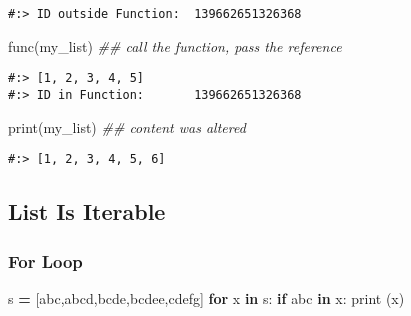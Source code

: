 \documentclass[
]{book}
\newenvironment{Shaded}{\begin{snugshade}}{\end{snugshade}}
\newcommand{\BuiltInTok}[1]{#1}
\newcommand{\CommentTok}[1]{\textcolor[rgb]{0.37,0.37,0.37}{\textit{#1}}}
\newcommand{\ControlFlowTok}[1]{\textcolor[rgb]{0.27,0.27,0.27}{\textbf{#1}}}
\newcommand{\KeywordTok}[1]{\textcolor[rgb]{0.27,0.27,0.27}{\textbf{#1}}}
\newcommand{\NormalTok}[1]{#1}
\newcommand{\OperatorTok}[1]{\textcolor[rgb]{0.43,0.43,0.43}{\textbf{#1}}}
\newcommand{\StringTok}[1]{\textcolor[rgb]{0.5,0.5,0.5}{#1}}
\begin{document}
\begin{verbatim}
#:> ID outside Function:  139662651326368
\end{verbatim}

\begin{Shaded}
\begin{Highlighting}[]
\NormalTok{func(my\_list)  }\CommentTok{\#\# call the function, pass the reference}
\end{Highlighting}
\end{Shaded}

\begin{verbatim}
#:> [1, 2, 3, 4, 5]
#:> ID in Function:       139662651326368
\end{verbatim}

\begin{Shaded}
\begin{Highlighting}[]
\BuiltInTok{print}\NormalTok{(my\_list) }\CommentTok{\#\# content was altered}
\end{Highlighting}
\end{Shaded}

\begin{verbatim}
#:> [1, 2, 3, 4, 5, 6]
\end{verbatim}

\hypertarget{list-is-iterable}{%
\subsection{List Is Iterable}\label{list-is-iterable}}

\hypertarget{for-loop}{%
\subsubsection{For Loop}\label{for-loop}}

\begin{Shaded}
\begin{Highlighting}[]
\NormalTok{s }\OperatorTok{=}\NormalTok{ [}\StringTok{\textquotesingle{}abc\textquotesingle{}}\NormalTok{,}\StringTok{\textquotesingle{}abcd\textquotesingle{}}\NormalTok{,}\StringTok{\textquotesingle{}bcde\textquotesingle{}}\NormalTok{,}\StringTok{\textquotesingle{}bcdee\textquotesingle{}}\NormalTok{,}\StringTok{\textquotesingle{}cdefg\textquotesingle{}}\NormalTok{]}
\ControlFlowTok{for}\NormalTok{ x }\KeywordTok{in}\NormalTok{ s:}
    \ControlFlowTok{if} \StringTok{\textquotesingle{}abc\textquotesingle{}} \KeywordTok{in}\NormalTok{ x:}
        \BuiltInTok{print}\NormalTok{ (x)}
\end{Highlighting}
\end{Shaded}
\end{document}

